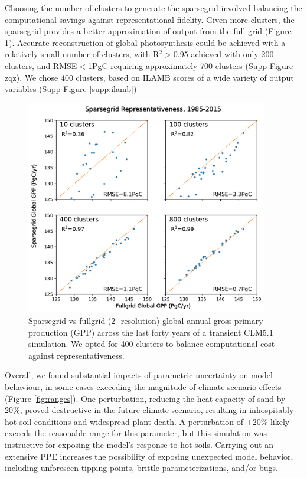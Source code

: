 \documentclass[draft]{agujournal2019}
\begin{document}
Choosing the number of clusters to generate the sparsegrid involved balancing the computational savings against representational fidelity. Given more clusters, the sparsegrid provides a better approximation of output from the full grid (Figure \ref{fig:sg}). Accurate reconstruction of global photosynthesis could be achieved with a relatively small number of clusters, with R$^2>$0.95 achieved with only 200 clusters, and RMSE$<$1PgC requiring approximately 700 clusters (Supp Figure zqz). We chose 400 clusters, based on ILAMB scores of a wide variety of output variables (Supp Figure \ref{supp:ilamb})
\begin{figure}[h]
\centering
\includegraphics[width=25pc]{../figs/sparsegrid_gpp.pdf}
\caption{Sparsegrid vs fullgrid (2$^{\circ}$ resolution) global annual gross primary production (GPP) across the last forty years of a transient CLM5.1 simulation. We opted for 400 clusters to balance computational cost against representativeness.}
\label{fig:sg}
\end{figure}

Overall, we found substantial impacts of parametric uncertainty on model behaviour, in some cases exceeding the magnitude of climate scenario effects (Figure \ref{fig:ranges}). One perturbation, reducing the heat capacity of sand by 20\%, proved destructive in the future climate scenario, resulting in inhospitably hot soil conditions and widespread plant death. A perturbation of $\pm$20\% likely exceeds the reasonable range for this parameter, but this simulation was instructive for exposing the model's response to hot soils. Carrying out an extensive PPE increases the possibility of exposing unexpected model behavior, including unforeseen tipping points, brittle parameterizations,  and/or bugs.
\end{document}
